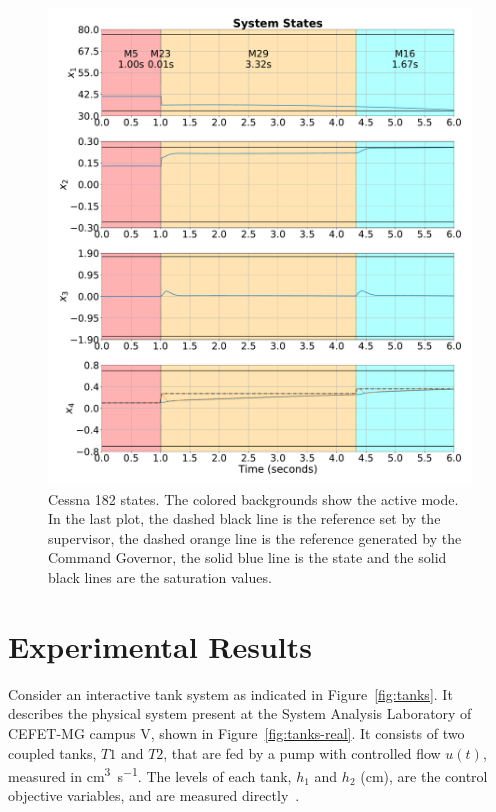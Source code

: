 \begin{figure}[ht!]
  \centering
  \includegraphics[height=0.6\textheight]{imgs/cessna-x}
  \caption[Cessna 182 states.]{Cessna 182 states. The colored backgrounds show
    the active mode. In the last plot, the dashed black line is the reference
    set by the supervisor, the dashed orange line is the reference generated by
    the Command Governor, the solid blue line is the state and the solid black
    lines are the saturation values.}%
  \label{fig:cessna-x}
\end{figure}

\section{Experimental Results}%
\label{sec:experimental-results}

Consider an interactive tank system as indicated in Figure~\ref{fig:tanks}. It
describes the physical system present at the System Analysis Laboratory of
CEFET-MG campus V, shown in Figure~\ref{fig:tanks-real}. It consists of two
coupled tanks, \(T1\) and \(T2\), that are fed by a pump with controlled flow
\(u(t)\), measured in \si{\cubic\centi\metre\per\second}. The levels of each
tank, \(h_1\) and \(h_2\) (\si{\centi\metre}), are the control objective
variables, and are measured
directly~\parencite{franco.oliveira.ea:síntese,sousa.leite.ea:affordable,lopes.leite.ea:anti-windup}.

